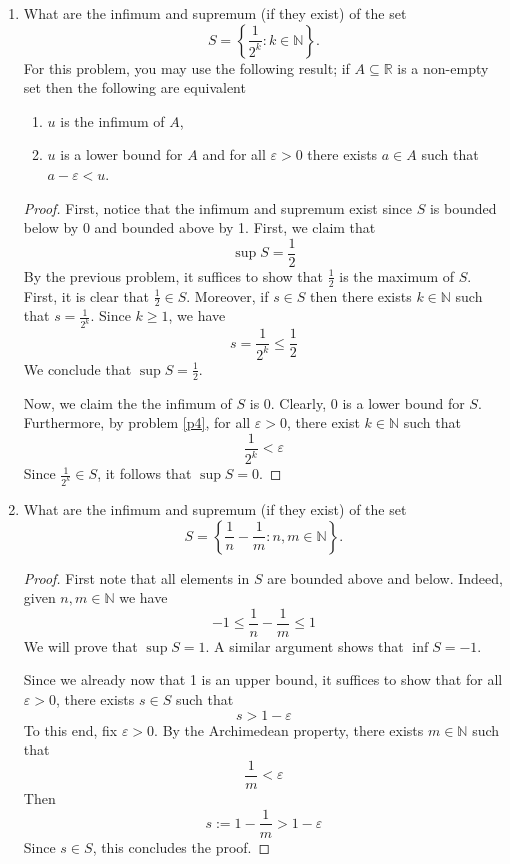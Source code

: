 \documentclass[12pt, reqno]{article}
\numberwithin{equation}{section}
\theoremstyle{definition}
\theoremstyle{remark}
\newcommand{\NN}{\mathbb{N}}
\newcommand{\RR}{\mathbb{R}}
\newcommand{\set}[1]{\left\{#1\right\}}
\renewcommand{\epsilon}{\varepsilon}
\begin{document}
\begin{enumerate}[leftmargin=*]
	\item What are the infimum and supremum (if they exist) of the set
	      \[
		      S = \set{\frac{1}{2^k} : k\in \NN}.
	      \]
	      For this problem, you may use the following result; if $A\subseteq \RR$ is a non-empty set then the following are equivalent
	      \begin{enumerate}
		      \item $u$ is the infimum of $A$,
		      \item $u$ is a lower bound for $A$ and for all $\epsilon>0$ there exists $a\in A$ such that $a-\epsilon < u$.
	      \end{enumerate}

	      \begin{proof}
		      First, notice that the infimum and supremum exist since $S$ is bounded below by 0 and bounded above by 1. First, we claim that
		      \[
			      \sup S = \frac{1}{2}
		      \]
		      By the previous problem, it suffices to show that $\frac{1}{2}$ is the maximum of $S$. First, it is clear that $\frac{1}{2} \in S$. Moreover, if $s\in S$ then there exists $k\in\NN$ such that $s = \frac{1}{2^k}$. Since $k \geq 1$, we have
		      \[
			      s = \frac{1}{2^k} \leq \frac{1}{2}
		      \]
		      We conclude that $\sup S = \frac{1}{2}$.

		      Now, we claim the the infimum of $S$ is 0. Clearly, 0 is a lower bound for $S$. Furthermore, by problem \ref{p4}, for all $\epsilon > 0$, there exist $k\in \NN$ such that
		      \[
			      \frac{1}{2^k} <\epsilon
		      \]
		      Since $\frac{1}{2^k}\in S$, it follows that $\sup S = 0$.
	      \end{proof}

	\item What are the infimum and supremum (if they exist) of the set
	      \[
		      S = \set{\frac{1}{n} - \frac{1}{m} : n,m\in \NN}.
	      \]

	      \begin{proof}
		      First note that all elements in $S$ are bounded above and below. Indeed, given $n,m\in \NN$ we have
		      \[
			      -1 \leq \frac{1}{n} - \frac{1}{m} \leq 1
		      \]
		      We will prove that $\sup S = 1$. A similar argument shows that $\inf S = -1$.

		      Since we already now that 1 is an upper bound, it suffices to show that for all $\epsilon > 0$, there exists $s\in S$ such that
		      \[
			      s > 1-\epsilon
		      \]
		      To this end, fix $\epsilon > 0$. By the Archimedean property, there exists $m\in\NN$ such that
		      \[
			      \frac{1}{m} < \epsilon
		      \]
		      Then
		      \[
			      s:= 1 - \frac{1}{m} > 1-\epsilon
		      \]
		      Since $s\in S$, this concludes the proof.
	      \end{proof}


\end{enumerate}
\end{document}
